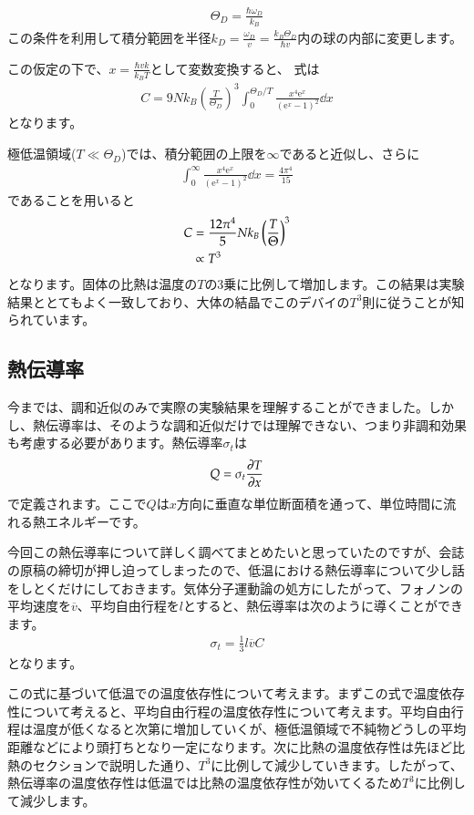 \documentclass[10pt,b5paper,papersize,dvipdfmx]{jsbook}
\begin{document}
\begin{align}
  \Theta_D = \frac{\hbar \omega_D}{k_B}
\end{align}
この条件を利用して積分範囲を半径$k_D=\frac{\omega_D}{v} = \frac{k_B\Theta_D}{\hbar v}$内の球の内部に変更します。\par
この仮定の下で、$x = \frac{\hbar v k}{k_B T}$として変数変換すると、 式は
\begin{align}
  C = 9Nk_B\left(\frac{T}{\Theta_D}\right)^3\int_0^{\Theta_D/T}\frac{x^4\mathrm{e}^x}{(\mathrm{e}^x -1)^2}\dd{x}
\end{align}
となります。\par
極低温領域($T \ll \Theta_D$)では、積分範囲の上限を$\infty$であると近似し、さらに
\begin{align}
  \int_0^\infty \frac{x^4 \mathrm{e}^x}{(\mathrm{e}^x-1)^2}\dd{x} = \frac{4\pi^4}{15}
\end{align}
であることを用いると
\begin{align}
  C &= \frac{12\pi^4}{5}Nk_B\left(\frac{T}{\Theta}\right)^3 \notag\\
  &\propto T^3  
\end{align}
となります。固体の比熱は温度の$T$の3乗に比例して増加します。この結果は実験結果ととてもよく一致しており、大体の結晶でこのデバイの$T^3$則に従うことが知られています。
\subsection{熱伝導率}
今までは、調和近似のみで実際の実験結果を理解することができました。しかし、熱伝導率は、そのような調和近似だけでは理解できない、つまり非調和効果も考慮する必要があります。熱伝導率$\sigma_t$は
\begin{align}
  Q = \sigma_t \pdv {T}{x}
\end{align}
で定義されます。ここで$Q$は$x$方向に垂直な単位断面積を通って、単位時間に流れる熱エネルギーです。\par
今回この熱伝導率について詳しく調べてまとめたいと思っていたのですが、会誌の原稿の締切が押し迫ってしまったので、低温における熱伝導率について少し話をしとくだけにしておきます。気体分子運動論の処方にしたがって、フォノンの平均速度を$\overline{v}$、平均自由行程を$l$とすると、熱伝導率は次のように導くことができます。
\begin{align}
  \sigma_t = \frac{1}{3}l\overline{v}C
\end{align}
となります。\par
この式に基づいて低温での温度依存性について考えます。まずこの式で温度依存性について考えると、平均自由行程の温度依存性について考えます。平均自由行程は温度が低くなると次第に増加していくが、極低温領域で不純物どうしの平均距離などにより頭打ちとなり一定になります。次に比熱の温度依存性は先ほど比熱のセクションで説明した通り、$T^3$に比例して減少していきます。したがって、熱伝導率の温度依存性は低温では比熱の温度依存性が効いてくるため$T^3$に比例して減少します。
\end{document}
